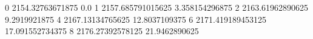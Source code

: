 0 2154.32763671875 0.0
1 2157.685791015625 3.358154296875
2 2163.61962890625 9.2919921875
4 2167.13134765625 12.8037109375
6 2171.419189453125 17.091552734375
8 2176.27392578125 21.9462890625
